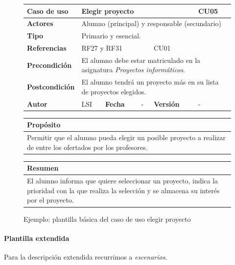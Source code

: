 \documentclass[12pt,spanish]{article}
\begin{document}
\begin{figure}[H]
\centering
\begin{tabular}{|m{3cm}|m{2.65cm}|m{2cm}|m{2cm}|m{2cm}|m{1cm}|}
\hline
\textbf{Caso de uso} &  \multicolumn{4}{m{9.65cm}|}{Elegir proyecto} &  \cellcolor{gray!40}CU05 \\
\hline
\textbf{Actores} & \multicolumn{5}{m{9.65cm}|}{Alumno (principal) y responsable (secundario)} \\
\hline
\textbf{Tipo} & \multicolumn{5}{m{9.65cm}|}{Primario y esencial.} \\
\hline
\textbf{Referencias} &\multicolumn{3}{m{4.77cm}|}{RF27 y RF31} & \multicolumn{2}{m{4.77cm}|}{CU01} \\
\hline
\textbf{Precondición} & \multicolumn{5}{m{9.65cm}|}{El alumno debe estar matriculado en la asignatura \textit{Proyectos informáticos}.} \\
\hline
\textbf{Postcondición} & \multicolumn{5}{m{9.65cm}|}{El alumno tendrá un proyecto más en su lista de proyectos elegidos.} \\
\hline
\textbf{Autor} & LSI & \textbf{Fecha} & -  & \textbf{Versión} & - \\
\hline
\end{tabular}

\vspace{1cm}

\begin{tabular}{|m{16.2cm}|}
\hline
\textbf{Propósito} \\
\hline
Permitir que el alumno pueda elegir un posible proyecto a realizar de entre los ofertados por los profesores. \\
\hline
\end{tabular}

\vspace{1cm}

\begin{tabular}{|m{16.2cm}|}
\hline
\textbf{Resumen} \\
\hline
El alumno informa que quiere seleccionar un proyecto, indica la prioridad con la que realiza la selección y se almacena su interés por el proyecto. \\
\hline
\end{tabular}

\caption{Ejemplo: plantilla básica del caso de uso elegir proyecto}

\end{figure}


\paragraph{Plantilla extendida}
Para la descripción extendida recurrimos a \emph{escenarios}.\\
\end{document}
